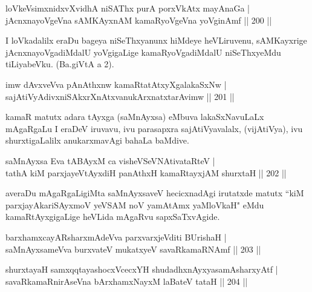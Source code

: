 \begin{shl}
loVkeV\s simxnidxvXvidhA niSAThx purA porxVkAtx mayA\s naGa |\\
jAcnxnayoVgeVna sAMKAyxnAM kamaRyoVgeVna yoVginAmf \hfill || 200 ||
\end{shl}

\begin{artha}
I loVkadalilx eraDu bageya niSeThxyanunx hiMdeye heVLiruvenu, sAMKayxrige jAcnxnayoVgadiMdalU yoVgigaLige kamaRyoVgadiMdalU niSeThxyeMdu tiLiya\-beVku. (Ba.giVtA a 2).
\end{artha}


\begin{shl}
imw dAvxveVva pAnAthxnw kamaRtatAtxyXgalakaSxNw |\\
\footnotemark[1]{}sajAtiVyAdivxniSAkxrXnAtxvanukArxnatxtarAvimw \hfill || 201 ||
\end{shl}

\begin{artha}
kamaR matutx adara tAyxga (saMnAyxsa) eMbuva lakaSxNavuLaLx mAgaRgaLu I eraDeV iruvavu, ivu parasapxra sajAtiVyavalalx, (vijAtiVya), ivu shurxtigaLalilx anukarxmavAgi bahaLa baMdive.
\end{artha}

\begin{shl}
saMnAyxsa Eva tABAyxM ca visheVSeVNAtivataRteV |\\
tathA kiM parxjayeVtAyxdiH panAthxH kamaRtayxjAM shurxtaH \hfill || 202 ||
\end{shl}

\begin{artha}
averaDu mAgaRgaLigiMta saMnAyxsaveV hecicxnadAgi irutatxde matutx ``kiM \break parxjayAkariSAyxmoV yeVSAM noV yamAtAmx yaMloVkaH" eMdu kamaR\-tAyxgigaLige heVLida mAgaRvu sapxSaTxvAgide.
\end{artha}

\begin{shl}
barxhamxcayARsharxmAdeVva parxvarxjeVditi BUrishaH |\\
saMnAyxsameVva burxvateV mukatxyeV savaRkamaRNAmf \hfill || 203 ||
\end{shl}

\begin{shl}
shurxtayaH samxqqtayashocxVcecxYH shudadhxnAyxyasamAsharxyAtf |\\
savaRkamaRnirAseVna bArxhamxNayxM laBateV tataH \hfill || 204 ||
\end{shl}

